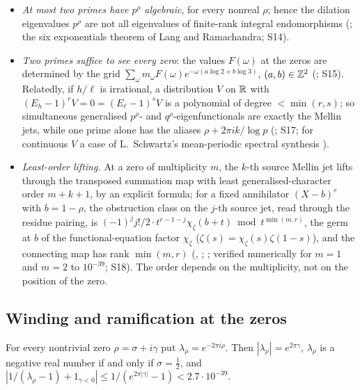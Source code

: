\begin{itemize}
\item \emph{At most two primes have $p^\rho$ algebraic}, for every nonreal $\rho$; hence the dilation eigenvalues $p^\rho$ are not all eigenvalues of finite-rank integral endomorphisms (; the six exponentials theorem of Lang and Ramachandra; S14).
\item \emph{Two primes suffice to see every zero}: the values $F(\omega)$ at the zeros are determined by the grid $\sum_\omega m_\omega F(\omega)e^{-\omega(a\log2+b\log3)}$, $(a,b)\in\mathbb{Z}^2$ (; S15). Relatedly, if $h/\ell$ is irrational, a distribution $V$ on $\mathbb{R}$ with $(E_h-1)^rV=0=(E_\ell-1)^sV$ is a polynomial of degree $<\min(r,s)$; so simultaneous generalised $p^\rho$- and $q^\rho$-eigenfunctionals are exactly the Mellin jets, while one prime alone has the aliases $\rho+2\pi ik/\log p$ (; S17; for continuous $V$ a case of L.~Schwartz's mean-periodic spectral synthesis \cite{SchwartzMP}).
\item \emph{Least-order lifting.} At a zero of multiplicity $m$, the $k$-th source Mellin jet lifts through the transposed summation map with least generalised-character order $m+k+1$, by an explicit formula; for a fixed annihilator $(X-b)^r$ with $b=1-\rho$, the obstruction class on the $j$-th source jet, read through the residue pairing, is $(-1)^jj!/2\cdot t^{r-1-j}\chi_\zeta(b+t)\bmod t^{\min(m,r)}$, the germ at $b$ of the functional-equation factor $\chi_\zeta$ ($\zeta(s)=\chi_\zeta(s)\zeta(1-s)$), and the connecting map has rank $\min(m,r)$ (, ; ; verified numerically for $m=1$ and $m=2$ to $10^{-39}$; S18). The order depends on the multiplicity, not on the position of the zero.
\end{itemize}

\subsection{Winding and ramification at the zeros}

\begin{lemma}\label{lem:winding}
For every nontrivial zero $\rho=\sigma+i\gamma$ put $\lambda_\rho=e^{-2\pi i\rho}$. Then $|\lambda_\rho|=e^{2\pi\gamma}$, $\lambda_\rho$ is a negative real number if and only if $\sigma=\tfrac12$, and $|1/(\lambda_\rho-1)+1_{\gamma<0}|\le1/(e^{2\pi|\gamma|}-1)<2.7\cdot10^{-39}$.
\end{lemma}

